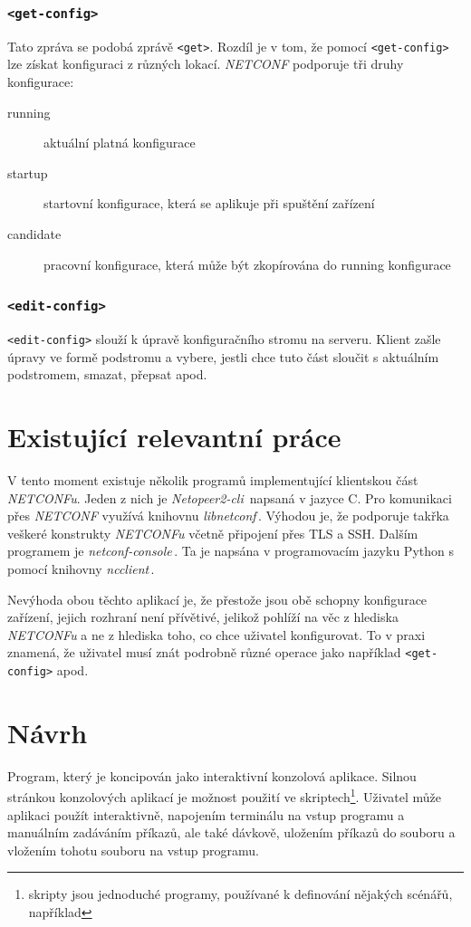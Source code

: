 \documentclass[thesis=B,czech,hidelinks]{FITthesis}[2019/03/06]
\begin{document}
\subsection{\texttt{<get-config>}}
Tato zpráva se podobá zprávě \texttt{<get>}. Rozdíl je v tom, že pomocí \texttt{<get-config>} lze získat konfiguraci z různých lokací. \textit{NETCONF} podporuje tři druhy konfigurace:
\begin{description}
    \item[running]{aktuální platná konfigurace}
    \item[startup]{startovní konfigurace, která se aplikuje při spuštění zařízení}
    \item[candidate]{pracovní konfigurace, která může být zkopírována do running konfigurace}
\end{description}

\subsection{\texttt{<edit-config>}}
\texttt{<edit-config>} slouží k úpravě konfiguračního stromu na serveru. Klient zašle úpravy ve formě podstromu a vybere, jestli chce tuto část sloučit s aktuálním podstromem, smazat, přepsat apod.


\chapter{Existující relevantní práce}
V tento moment existuje několik programů implementující klientskou část \textit{NETCONFu}. Jeden z nich je \textit{Netopeer2-cli}\,\cite{netopeer} napsaná v jazyce C. Pro komunikaci přes \textit{NETCONF} využívá knihovnu \textit{libnetconf}\,\cite{libnetconf}. Výhodou je, že podporuje takřka veškeré konstrukty \textit{NETCONFu} včetně připojení přes TLS a SSH\@. Dalším programem je \textit{netconf-console}\,\cite{netconf-console}. Ta je napsána v programovacím jazyku Python s pomocí knihovny \textit{ncclient}\,\cite{ncclient}.

Nevýhoda obou těchto aplikací je, že přestože jsou obě schopny konfigurace zařízení, jejich rozhraní není přívětivé, jelikož pohlíží na věc z hlediska \textit{NETCONFu} a ne z hlediska toho, co chce uživatel konfigurovat. To v praxi znamená, že uživatel musí znát podrobně různé operace jako například \texttt{<get-config>} apod.


\chapter{Návrh}
Program, který  je koncipován jako interaktivní konzolová aplikace. Silnou stránkou konzolových aplikací je možnost použití ve skriptech\footnote{skripty jsou jednoduché programy, používané k definování nějakých scénářů, například }. Uživatel může aplikaci použít interaktivně, napojením terminálu na vstup programu a manuálním zadáváním příkazů, ale také dávkově, uložením příkazů do souboru a vložením tohotu souboru na vstup programu.
\end{document}
